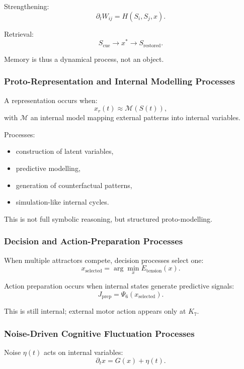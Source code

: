 Strengthening:
\[
\partial_t W_{ij} = H(S_i, S_j, x).
\]

Retrieval:
\[
S_{\text{cue}} \to x^\ast \to S_{\text{restored}}.
\]

Memory is thus a dynamical process, not an object.

\subsubsection{Proto-Representation and Internal Modelling Processes}

A representation occurs when:
\[
x_r(t) \approx \mathcal{M}(S(t)),
\]
with $\mathcal{M}$ an internal model mapping external patterns into 
internal variables.

Processes:
\begin{itemize}
    \item construction of latent variables,
    \item predictive modelling,
    \item generation of counterfactual patterns,
    \item simulation-like internal cycles.
\end{itemize}

This is not full symbolic reasoning, but structured proto-modelling.

\subsubsection{Decision and Action-Preparation Processes}

When multiple attractors compete, decision processes select one:
\[
x_{\text{selected}} = 
\arg\min_x E_{\text{tension}}(x).
\]

Action preparation occurs when internal states generate predictive 
signals:
\[
J_{\text{prep}} = \Psi_6(x_{\text{selected}}).
\]

This is still internal; external motor action appears only at $K_7$.

\subsubsection{Noise-Driven Cognitive Fluctuation Processes}

Noise $\eta(t)$ acts on internal variables:
\[
\partial_t x = G(x) + \eta(t).
\]

